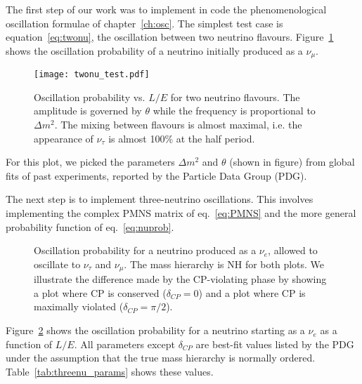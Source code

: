 The first step of our work was to implement in code the phenomenological
oscillation formulae of chapter~\ref{ch:osc}. The simplest test case
is equation~\ref{eq:twonu}, the oscillation between two neutrino flavours.
Figure~\ref{fig:twonu_plots} shows the oscillation
probability of a neutrino initially produced as a $\nu_\mu$. 
\begin{figure}
	\centering
	\texttt{[image: twonu\_test.pdf]}
	\captionsetup{width=0.9\textwidth}
	\caption{Oscillation probability vs. $L/E$ for two neutrino flavours. The
	amplitude is governed by $\theta$ while the frequency is proportional to
	$\Delta m^2$. The mixing between flavours is almost maximal, i.e. the
	appearance of $\nu_\tau$ is almost 100\% at the half period.}
	\label{fig:twonu_plots}
\end{figure}
For this plot, we picked the parameters $\Delta m^2$ and $\theta$ (shown in
figure) from global fits of past experiments, reported by the Particle Data
Group (PDG)\cite{pdg}.

The next step is to implement three-neutrino oscillations. This involves
implementing the complex PMNS matrix of eq.~\ref{eq:PMNS} and the more general
probability function of eq.~\ref{eq:nuprob}. 
\begin{figure}
	\centering
\caption{Oscillation probability for a neutrino produced as a $\nu_e$, allowed to
	oscillate to $\nu_\tau$ and $\nu_\mu$. The mass hierarchy is NH for both
	plots. We illustrate the difference made by
	the CP-violating phase by showing a plot where CP is conserved
	($\delta_{CP}=0$) and a plot where CP is maximally violated ($\delta_{CP} =
	\pi/2$).}
\label{fig:threenu_plots}
\end{figure}
Figure~\ref{fig:threenu_plots} shows the oscillation probability for a neutrino
starting as a $\nu_e$ as a function of $L/E$. All parameters except
$\delta_{CP}$ are best-fit values listed by the PDG under the
assumption that the true mass hierarchy is normally ordered.
Table~\ref{tab:threenu_params} shows these values.


